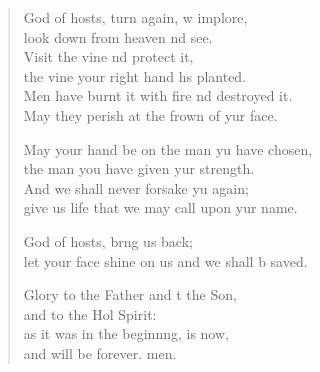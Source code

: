 \begin{verse}
\begin{patverse}
God of hosts, turn again, w implore,\Med\\
look down from heaven nd see.\\
Visit the vine nd protect it,\Med\\
the vine your right hand hs planted.\\
Men have burnt it with fire nd destroyed it.\Med\\
May they perish at the frown of yur face.

May your hand be on the man yu have chosen,\Med\\
the man you have given yur strength.\\
And we shall never forsake yu again;\Med\\
give us life that we may call upon yur name.

God of hosts, br\pointup{\i}ng us back;\Med\\
let your face shine on us and we shall b saved.

Glory to the Father and t the Son,\Med\\
and to the Hol Spirit:\\
as it was in the beginn\pointup{\i}ng, is now,\Med\\
and will be forever. men.
  \end{patverse}
\end{verse}
